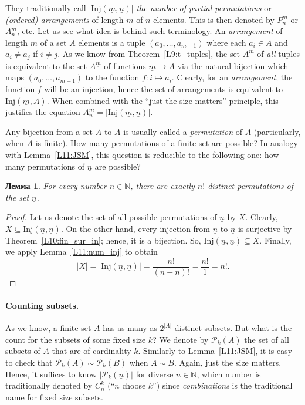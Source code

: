 \documentclass[12pt,notitlepage]{article}
\theoremstyle{plain}
\newtheorem{lemma}[thm]{Лемма}
\theoremstyle{definition}
\theoremstyle{plain}
\newcommand{\N}{\mathbb{N}}
\newcommand{\sbs}{\subseteq}
\newcommand{\mP}{\mathcal{P}}
\newcommand{\ul}[1]{\underline{#1}}
\newcommand{\1}{\mathbf{1}}
\newcommand{\0}{\mathbf{0}}
\begin{document}
They traditionally call $|\mathrm{Inj}(\ul{m},\ul{n})|$ \emph{the number of partial permutations} or \emph{(ordered) arrangements} of length $m$ of $n$ elements. This is then denoted by $P^m_n$ or $A^m_n$, etc.
Let us see what idea is behind such terminology. An \emph{arrangement} of length $m$ of a set $A$ elements is a tuple $(a_0,\ldots,a_{m-1})$ where each $a_i \in A$ and $a_i \neq a_j$ if $i \neq j$. As we know from Theorem~\ref{L9:t_tuples}, the set $A^m$ of \emph{all} tuples is equivalent to the set $A^{\ul{m}}$ of functions $\ul{m} \to A$ via the natural bijection which maps $(a_0,\ldots,a_{m-1})$ to the function $f \colon i \mapsto a_i$. Clearly, for an \emph{arrangement}, the function $f$ will be an injection, hence the set of arrangements is equivalent to $\mathrm{Inj}(\ul{m},A)$. When combined with the ``just the size matters'' principle, this justifies the equation $A^m_n = |\mathrm{Inj}(\ul{m},\ul{n})|$.


Any bijection from a set $A$ to $A$ is usually called a \emph{permutation} of $A$ (particularly, when $A$ is finite). How many permutations of a finite set are possible? In analogy with Lemma~\ref{L11:JSM}, this question is reducible to the following one: how many permutations of $\ul{n}$ are possible?

\begin{lemma}\label{L11:num_bij}
	For every number $n \in \N$, there are exactly $n!$ distinct permutations of the set $\ul{n}$.
\end{lemma}
\begin{proof}
	Let us denote the set of all possible permutations of $\ul{n}$ by $X$. Clearly, $X \sbs \mathrm{Inj}(\ul{n},\ul{n})$. On the other hand, every injection from $\ul{n}$ to $\ul{n}$ is surjective by Theorem~\ref{L10:fin_sur_in}; hence, it is a bijection. So, $\mathrm{Inj}(\ul{n},\ul{n}) \sbs X$. Finally, we apply Lemma~\ref{L11:num_inj} to obtain
	$$|X| = |\mathrm{Inj}(\ul{n},\ul{n})| = \dfrac{n!}{(n-n)!} = \dfrac{n!}{1} = n!.$$
\end{proof}

\paragraph{Counting subsets.} As we know, a finite set $A$ has as many as $2^{|A|}$ distinct subsets. But what is the count for the subsets of some fixed size $k$? We denote by $\mP_k(A)$ the set of all subsets of $A$ that are of cardinality $k$. Similarly to Lemma~\ref{L11:JSM}, it is easy to check that $\mP_k(A) \sim \mP_k(B)$ when $A \sim B$. Again, just the size matters. Hence, it suffices to know $|\mP_k(\ul{n})|$ for diverse $n \in \N$, which number is traditionally denoted by $C_n^k$ (``$n$ choose $k$'') since \emph{combinations} is the traditional name for fixed size subsets.
\end{document}

